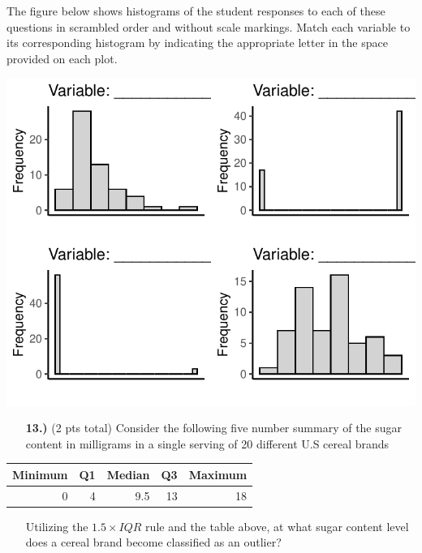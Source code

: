 \documentclass[
]{article}
\begin{document}
The figure below shows histograms of the student responses to each of
these questions in scrambled order and without scale markings. Match
each variable to its corresponding histogram by indicating the
appropriate letter in the space provided on each plot.

\includegraphics{Exam_1_Version_B_files/figure-latex/unnamed-chunk-4-1.pdf}

\begin{enumerate}
\item[\bf 13.)] (2 pts total) Consider the following five number summary of the sugar content in milligrams in a single serving of 20 different U.S cereal brands 
\end{enumerate}
\begin{table}[H]
\centering
\begin{tabular}{rrrrr}
\toprule
Minimum & Q1 & Median & Q3 & Maximum\\
\midrule
0 & 4 & 9.5 & 13 & 18\\
\bottomrule
\end{tabular}
\end{table}
\begin{enumerate}
\item[] Utilizing the $1.5 \times IQR$ rule and the table above, at what sugar content level does a cereal brand become classified as an outlier?
\end{enumerate}

\newpage
\end{document}
